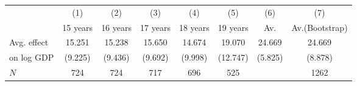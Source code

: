 \begin{tabular}{l*{7}{c}}
\hline\hline
            &\multicolumn{1}{c}{(1)}&\multicolumn{1}{c}{(2)}&\multicolumn{1}{c}{(3)}&\multicolumn{1}{c}{(4)}&\multicolumn{1}{c}{(5)}&\multicolumn{1}{c}{(6)}&\multicolumn{1}{c}{(7)}\\
            &    15 years&    16 years&    17 years&    18 years&    19 years&         Av.&Av.(Bootstrap)\\
\hline
Avg. effect &      15.251&      15.238&      15.650&      14.674&      19.070&      24.669&      24.669\\
on log GDP  &     (9.225)&     (9.436)&     (9.692)&     (9.998)&    (12.747)&     (5.825)&     (8.878)\\
\hline
\(N\)       &         724&         724&         717&         696&         525&            &        1262\\
\hline\hline
\end{tabular}
